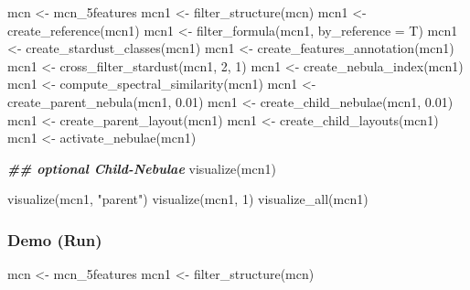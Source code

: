 \documentclass[
]{article}
\newenvironment{Shaded}{\begin{snugshade}}{\end{snugshade}}
\newcommand{\AttributeTok}[1]{\textcolor[rgb]{0.77,0.63,0.00}{#1}}
\newcommand{\DecValTok}[1]{\textcolor[rgb]{0.00,0.00,0.81}{#1}}
\newcommand{\DocumentationTok}[1]{\textcolor[rgb]{0.56,0.35,0.01}{\textbf{\textit{#1}}}}
\newcommand{\FloatTok}[1]{\textcolor[rgb]{0.00,0.00,0.81}{#1}}
\newcommand{\FunctionTok}[1]{\textcolor[rgb]{0.00,0.00,0.00}{#1}}
\newcommand{\NormalTok}[1]{#1}
\newcommand{\OtherTok}[1]{\textcolor[rgb]{0.56,0.35,0.01}{#1}}
\newcommand{\StringTok}[1]{\textcolor[rgb]{0.31,0.60,0.02}{#1}}
\begin{document}
\begin{Shaded}
\begin{Highlighting}[]
\NormalTok{mcn }\OtherTok{\textless{}{-}}\NormalTok{ mcn\_5features}
\NormalTok{mcn1 }\OtherTok{\textless{}{-}} \FunctionTok{filter\_structure}\NormalTok{(mcn)}
\NormalTok{mcn1 }\OtherTok{\textless{}{-}} \FunctionTok{create\_reference}\NormalTok{(mcn1)}
\NormalTok{mcn1 }\OtherTok{\textless{}{-}} \FunctionTok{filter\_formula}\NormalTok{(mcn1, }\AttributeTok{by\_reference =}\NormalTok{ T)}
\NormalTok{mcn1 }\OtherTok{\textless{}{-}} \FunctionTok{create\_stardust\_classes}\NormalTok{(mcn1)}
\NormalTok{mcn1 }\OtherTok{\textless{}{-}} \FunctionTok{create\_features\_annotation}\NormalTok{(mcn1)}
\NormalTok{mcn1 }\OtherTok{\textless{}{-}} \FunctionTok{cross\_filter\_stardust}\NormalTok{(mcn1, }\DecValTok{2}\NormalTok{, }\DecValTok{1}\NormalTok{)}
\NormalTok{mcn1 }\OtherTok{\textless{}{-}} \FunctionTok{create\_nebula\_index}\NormalTok{(mcn1)}
\NormalTok{mcn1 }\OtherTok{\textless{}{-}} \FunctionTok{compute\_spectral\_similarity}\NormalTok{(mcn1)}
\NormalTok{mcn1 }\OtherTok{\textless{}{-}} \FunctionTok{create\_parent\_nebula}\NormalTok{(mcn1, }\FloatTok{0.01}\NormalTok{)}
\NormalTok{mcn1 }\OtherTok{\textless{}{-}} \FunctionTok{create\_child\_nebulae}\NormalTok{(mcn1, }\FloatTok{0.01}\NormalTok{)}
\NormalTok{mcn1 }\OtherTok{\textless{}{-}} \FunctionTok{create\_parent\_layout}\NormalTok{(mcn1)}
\NormalTok{mcn1 }\OtherTok{\textless{}{-}} \FunctionTok{create\_child\_layouts}\NormalTok{(mcn1)}
\NormalTok{mcn1 }\OtherTok{\textless{}{-}} \FunctionTok{activate\_nebulae}\NormalTok{(mcn1)}

\DocumentationTok{\#\# optional Child{-}Nebulae}
\FunctionTok{visualize}\NormalTok{(mcn1)}

\FunctionTok{visualize}\NormalTok{(mcn1, }\StringTok{"parent"}\NormalTok{)}
\FunctionTok{visualize}\NormalTok{(mcn1, }\DecValTok{1}\NormalTok{)}
\FunctionTok{visualize\_all}\NormalTok{(mcn1)}
\end{Highlighting}
\end{Shaded}

\hypertarget{demo-run}{%
\subsubsection{Demo (Run)}\label{demo-run}}

\begin{Shaded}
\begin{Highlighting}[]
\NormalTok{mcn }\OtherTok{\textless{}{-}}\NormalTok{ mcn\_5features}
\NormalTok{mcn1 }\OtherTok{\textless{}{-}} \FunctionTok{filter\_structure}\NormalTok{(mcn)}
\end{Highlighting}
\end{Shaded}
\end{document}
